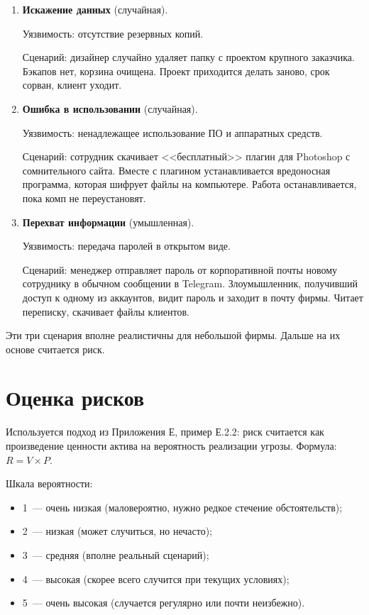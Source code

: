 \documentclass[a4paper,14pt]{extarticle}
\begin{document}
\begin{enumerate}[label=\textbf{\arabic*.}]
\item \textbf{Искажение данных} (случайная).

Уязвимость: отсутствие резервных копий.

Сценарий: дизайнер случайно удаляет папку с проектом крупного заказчика. Бэкапов нет, корзина очищена. Проект приходится делать заново, срок сорван, клиент уходит.

\item \textbf{Ошибка в использовании} (случайная).

Уязвимость: ненадлежащее использование ПО и аппаратных средств.

Сценарий: сотрудник скачивает <<бесплатный>> плагин для Photoshop с сомнительного сайта. Вместе с плагином устанавливается вредоносная программа, которая шифрует файлы на компьютере. Работа останавливается, пока комп не переустановят.

\item \textbf{Перехват информации} (умышленная).

Уязвимость: передача паролей в открытом виде.

Сценарий: менеджер отправляет пароль от корпоративной почты новому сотруднику в обычном сообщении в Telegram. Злоумышленник, получивший доступ к одному из аккаунтов, видит пароль и заходит в почту фирмы. Читает переписку, скачивает файлы клиентов.
\end{enumerate}

Эти три сценария вполне реалистичны для небольшой фирмы. Дальше на их основе считается риск.

\section{Оценка рисков}

Используется подход из Приложения Е, пример Е.2.2: риск считается как произведение ценности актива на вероятность реализации угрозы. Формула: $R = V \times P$.

Шкала вероятности:

\begin{itemize}[label=---]
\item 1~--- очень низкая (маловероятно, нужно редкое стечение обстоятельств);
\item 2~--- низкая (может случиться, но нечасто);
\item 3~--- средняя (вполне реальный сценарий);
\item 4~--- высокая (скорее всего случится при текущих условиях);
\item 5~--- очень высокая (случается регулярно или почти неизбежно).
\end{itemize}
\end{document}
